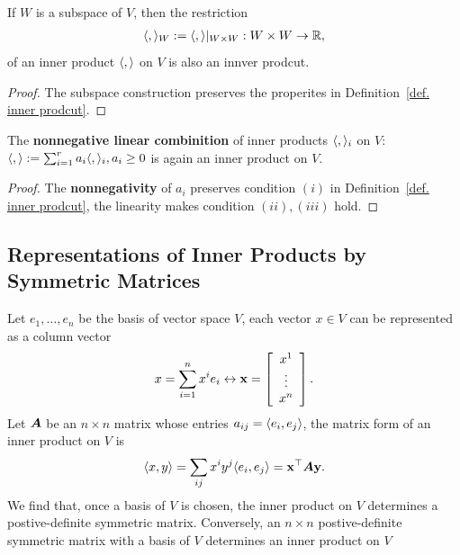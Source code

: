 \begin{proposition}
    If $W$ is a subspace of $V$, then the restriction
    \begin{align}
        \langle ,  \rangle_W:=\langle ,  \rangle|_{W\times W}: W \times W \rightarrow \mathbb{R},
    \end{align}
    of an inner product
    $\langle ,  \rangle$ on $V$ is also an innver prodcut.
\end{proposition}
\begin{proof}
    The subspace construction preserves the properites 
    in Definition~\ref{def. inner prodcut}.
\end{proof}

\begin{proposition}
    The \textbf{nonnegative linear combinition} of inner products $\langle ,  \rangle_i$
     on $V$: $\langle ,  \rangle:=\sum_{i=1}^{r}a_i\langle ,  \rangle_i, a_i \geq 0$ is again an 
     inner product on $V$.
\label{prop. nonneg combinition of metrics}
\end{proposition}
\begin{proof}
    The \textbf{nonnegativity} of $a_i$ preserves condition $(i)$ 
    in Definition~\ref{def. inner prodcut}, the linearity makes condition $(ii),(iii)$ hold.
\end{proof}

\subsection{Representations of Inner Products by Symmetric Matrices}
Let $e_1,\dots, e_n$ be the basis of vector space $V$, 
each vector $x \in V$ can be represented as a column vector
\begin{equation}
    x=\sum_{i=1}^{n}x^i e_i \leftrightarrow {\mathbf{x}}=\left[\begin{array}{c}
        x^1 \\
        \vdots \\
        x^n
    \end{array}\right].
\end{equation}
Let ${\bm{A}}$ be an $n\times n$ matrix whose entries $a_{ij}=\langle e_i, e_j \rangle$, 
the matrix form of an inner product on $V$ is
\begin{equation}
    \langle x, y \rangle=\sum_{ij}x^i y^j \langle e_i, e_j \rangle = {\mathbf{x}}^\top {\bm{A}} {\mathbf{y}}.
\end{equation}
We find that, once a basis of $V$ is chosen, the inner product on $V$
determines a postive-definite symmetric matrix. Conversely, an $n \times n$
postive-definite symmetric matrix with a basis of $V$ determines an inner product 
on $V$


